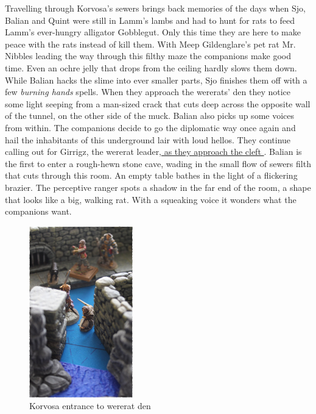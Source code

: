 Travelling through Korvosa's sewers brings back memories of the days when Sjo, Balian and Quint were still in Lamm's lambs and had to hunt for rats to feed Lamm's ever-hungry alligator Gobblegut. Only this time they are here to make peace with the rats instead of kill them. With Meep Gildenglare's pet rat Mr. Nibbles leading the way through this filthy maze the companions make good time. Even an ochre jelly that drops from the ceiling hardly slows them down. While Balian hacks the slime into ever smaller parts, Sjo finishes them off with a few {\itshape burning hands} spells. When they approach the wererats' den they notice some light seeping from a man-sized crack that cuts deep across the opposite wall of the tunnel, on the other side of the muck. Balian also picks up some voices from within. The companions decide to go the diplomatic way once again and hail the inhabitants of this underground lair with loud hellos. They continue calling out for Girrigz, the wererat leader,\hyperref[fig:Korvosa-entrance-to-wererat-den-503383346]{ as they approach the cleft } . Balian is the first to enter a rough-hewn stone cave, wading in the small flow of sewers filth that cuts through this room. An empty table bathes in the light of a flickering brazier. The perceptive ranger spots a shadow in the far end of the room, a shape that looks like a big, walking rat. With a squeaking voice it wonders what the companions want. \\

\begin{figure}[h]
	\centering
	\includegraphics[width=0.4\textwidth]{images/Korvosa-entrance-to-wererat-den-503383346_mod.jpg}
	\caption{Korvosa entrance to wererat den}
	\label{fig:Korvosa-entrance-to-wererat-den-503383346}
\end{figure}

